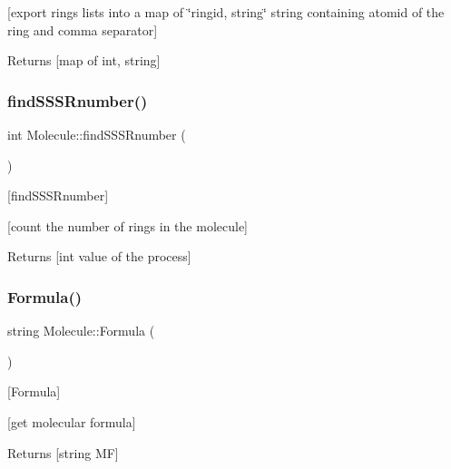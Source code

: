 \mbox{[}export rings lists into a map of \char`\"{}ringid, string\char`\"{} string containing atomid of the ring and comma separator\mbox{]}

\begin{DoxyReturn}{Returns}
\mbox{[}map of int, string\mbox{]} 
\end{DoxyReturn}
\mbox{\label{class_molecule_aaca41709fb5306fbfd11f4a75664e2ed}} 
\subsubsection{\texorpdfstring{find\+S\+S\+S\+Rnumber()}{findSSSRnumber()}}
{\footnotesize\ttfamily int Molecule\+::find\+S\+S\+S\+Rnumber (\begin{DoxyParamCaption}{ }\end{DoxyParamCaption})}



\mbox{[}find\+S\+S\+S\+Rnumber\mbox{]} 

\mbox{[}count the number of rings in the molecule\mbox{]}

\begin{DoxyReturn}{Returns}
\mbox{[}int value of the process\mbox{]} 
\end{DoxyReturn}
\mbox{\label{class_molecule_a2a8be2c496fe515635ad70949ca3c634}} 
\subsubsection{\texorpdfstring{Formula()}{Formula()}}
{\footnotesize\ttfamily string Molecule\+::\+Formula (\begin{DoxyParamCaption}{ }\end{DoxyParamCaption})}



\mbox{[}Formula\mbox{]} 

\mbox{[}get molecular formula\mbox{]}

\begin{DoxyReturn}{Returns}
\mbox{[}string MF\mbox{]} 
\end{DoxyReturn}
\mbox{\label{class_molecule_a9fe4d5adae1305a7eeb0a7f4a7b5bcad}} 
